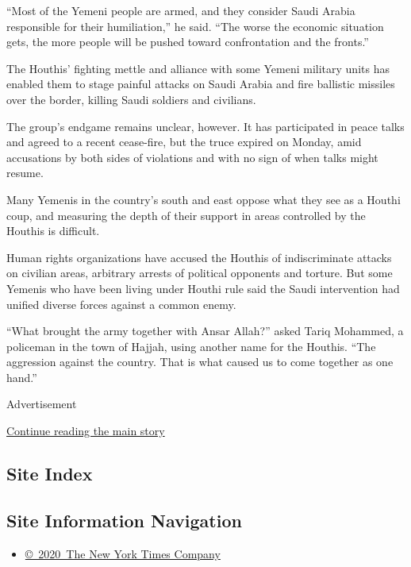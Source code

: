 ``Most of the Yemeni people are armed, and they consider Saudi Arabia
responsible for their humiliation,'' he said. ``The worse the economic
situation gets, the more people will be pushed toward confrontation and
the fronts.''

The Houthis' fighting mettle and alliance with some Yemeni military
units has enabled them to stage painful attacks on Saudi Arabia and fire
ballistic missiles over the border, killing Saudi soldiers and
civilians.

The group's endgame remains unclear, however. It has participated in
peace talks and agreed to a recent cease-fire, but the truce expired on
Monday, amid accusations by both sides of violations and with no sign of
when talks might resume.

Many Yemenis in the country's south and east oppose what they see as a
Houthi coup, and measuring the depth of their support in areas
controlled by the Houthis is difficult.

Human rights organizations have accused the Houthis of indiscriminate
attacks on civilian areas, arbitrary arrests of political opponents and
torture. But some Yemenis who have been living under Houthi rule said
the Saudi intervention had unified diverse forces against a common
enemy.

``What brought the army together with Ansar Allah?'' asked Tariq
Mohammed, a policeman in the town of Hajjah, using another name for the
Houthis. ``The aggression against the country. That is what caused us to
come together as one hand.''

Advertisement

\protect\hyperlink{after-bottom}{Continue reading the main story}

\hypertarget{site-index}{%
\subsection{Site Index}\label{site-index}}

\hypertarget{site-information-navigation}{%
\subsection{Site Information
Navigation}\label{site-information-navigation}}

\begin{itemize}
\tightlist
\item
  \href{https://help.nytimes3xbfgragh.onion/hc/en-us/articles/115014792127-Copyright-notice}{©~2020~The
  New York Times Company}
\end{itemize}


